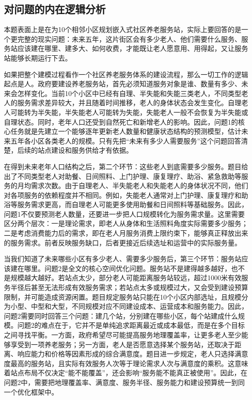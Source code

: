 \documentclass[UTF8]{ctexart}
\begin{document}
\subsection{对问题的内在逻辑分析}

本题表面上是在为10个相邻小区规划嵌入式社区养老服务站，实际上要回答的是一个更完整的现实问题：未来五年，这片街区会有多少老人、他们需要什么服务、服务站应该建在哪里、建多大、如何收费，才能既让老人愿意用、用得起，又让服务站能够长期运行下去。

如果把整个建模过程看作一个社区养老服务体系的建设流程，那么一切工作的逻辑起点是人。政府要建设养老服务站，首先必须知道服务对象是谁、数量有多少、未来会怎样变化。当前10个小区中已经有自理、半失能和失能三类老人，不同类型老人的服务需求差异较大，并且随着时间推移，老人的身体状态会发生变化。自理老人可能转为半失能，半失能老人可能转为失能，失能老人一般不会恢复为半失能或自理状态。同时，老年人口还受到自然死亡和新增老人的影响。因此，问题1的核心任务就是先建立一个能够逐年更新老人数量和健康状态结构的预测模型，估计未来五年各小区各类老人的规模。只有先把“未来有多少人需要服务”这个问题回答清楚，后续的站点建设和服务供给才有依据。

在得到未来老年人口结构之后，第二个环节：这些老人到底需要多少服务。题目给出了不同类型老人对助餐、日间照料、上门护理、康复理疗、助浴、紧急救助等服务的月均需求次数。由于自理老人、半失能老人和失能老人的身体状况不同，他们对各项服务的依赖程度并不相同。例如，失能老人通常对上门护理、康复理疗和助浴等服务需求更高，而自理老人可能更多使用助餐和日间照料等基础服务。因此，问题1不仅要预测老人数量，还要进一步把人口规模转化为服务需求量。这里需要区分两个层次：一是理论需求，即老人从身体和生活照料角度实际需要多少服务；二是考虑消费能力后的需求，即在老人月服务消费上限约束下，能够真正释放出来的服务需求。前者反映服务缺口，后者更接近后续选址和运营中的实际服务量。

当我们知道了未来哪些小区有多少老人、需要多少服务后，第三个环节：服务站应该建在哪里。问题2是全文的核心空间优化问题。服务站不是建得越多越好，也不是规模越大越好。若站点太少，部分老人可能距离服务站较远，超过1000米有效服务半径后甚至无法形成有效服务需求；若站点太多或规模过大，又会受到建设预算限制，并可能造成资源闲置。题目规定服务站只能在10个小区内部选址，且规模分为小型、中型和大型，不同规模对应不同建设成本、运营成本和服务能力。因此，问题2需要同时回答三个问题：建几个站，分别建在哪些小区，每个站建成什么规模。问题2的难点在于，它并不是单纯追求距离最近或成本最低，而是在多个目标之间寻找平衡。一方面，政府希望尽可能提高服务地理覆盖率，让更多老人至少能够享受到一项养老服务；另一方面，老人是否愿意选择某个服务站，还取决于距离、响应能力和价格等因素形成的综合满意度。题目进一步规定，老人只选择满意度最高的服务站，且实际有效服务人次等于理论需求人次与满意度的乘积。这意味着站点布局不仅决定“能不能覆盖”，还会影响“服务能不能真正被使用”。因此，在问题2中，需要把地理覆盖率、满意度、服务半径、服务能力和建设预算统一到同一个优化框架中。
\end{document}

